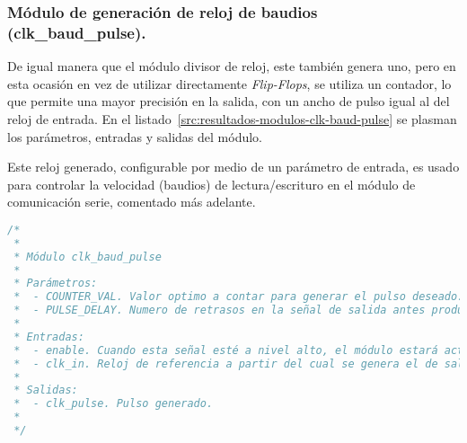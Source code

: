 


\subsubsection{Módulo de generación de reloj de baudios (clk\_baud\_pulse).}
De igual manera que el módulo divisor de reloj, este también genera uno, pero en esta ocasión en vez de utilizar directamente \emph{Flip-Flops}, se utiliza un contador, lo que permite una mayor precisión en la salida, con un ancho de pulso igual al del reloj de entrada. En el listado~\ref{src:resultados-modulos-clk-baud-pulse} se plasman los parámetros, entradas y salidas del módulo.

Este reloj generado, configurable por medio de un parámetro de entrada, es usado para controlar la velocidad (baudios) de lectura/escrituro en el módulo de comunicación serie, comentado más adelante.

\begin{lstlisting}[language=Verilog,
    caption={Parámetros, entradas y salidas del módulo clk\_baud\_pulse.},
    label=src:resultados-modulos-clk-baud-pulse]
/*
 *
 * Módulo clk_baud_pulse
 *
 * Parámetros:
 *  - COUNTER_VAL. Valor optimo a contar para generar el pulso deseado.
 *  - PULSE_DELAY. Numero de retrasos en la señal de salida antes producir un pulso.
 *
 * Entradas:
 *  - enable. Cuando esta señal esté a nivel alto, el módulo estará activo, y en caso contrario la salida estará siempre a nivel bajo, reiniciando además sus registros internos.
 *  - clk_in. Reloj de referencia a partir del cual se genera el de salida.
 *
 * Salidas:
 *  - clk_pulse. Pulso generado.
 *
 */
\end{lstlisting}


